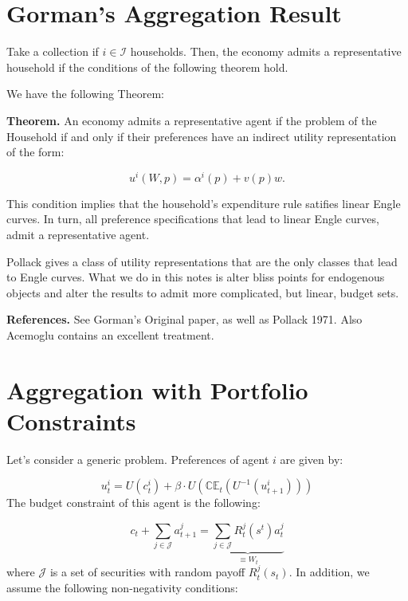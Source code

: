 \documentclass{article}
\begin{document}
\section{Gorman's Aggregation Result}

Take a collection if $i\in \mathcal{I}$ households. Then, the economy admits
a representative household if the conditions of the following theorem hold.

We have the following Theorem:

\textbf{Theorem.} An economy admits a representative agent if the problem of
the Household if and only if their preferences have an indirect utility
representation of the form:

\begin{equation*}
u^{i}\left( W,p\right) =\alpha ^{i}\left( p\right) +v\left( p\right) w.
\end{equation*}

This condition implies that the household's expenditure rule satifies linear
Engle curves. In turn, all preference specifications that lead to linear
Engle curves, admit a representative agent.

Pollack gives a class of utility representations that are the only classes
that lead to Engle curves. What we do in this notes is alter bliss points
for endogenous objects and alter the results to admit more complicated, but
linear, budget sets.

\textbf{References.} See Gorman's Original paper, as well as Pollack 1971.
Also Acemoglu contains an excellent treatment.

\section{Aggregation with Portfolio Constraints}

Let's consider a generic problem. Preferences of agent $i$ are given by:

\begin{equation*}
u_{t}^{i}=U\left( c_{t}^{i}\right) +\beta \cdot U\left( \mathbb{CE}%
_{t}\left( U^{-1}\left( u_{t+1}^{i}\right) \right) \right)
\end{equation*}%
The budget constraint of this agent is the following:

\begin{equation}
c_{t}+\sum_{j\in \mathcal{J}}a_{t+1}^{j}=\underbrace{\sum_{j\in \mathcal{J}%
}R_{t}^{j}\left( s^{t}\right) a_{t}^{j}}_{\equiv W_{t}}  \label{E_BC}
\end{equation}%
where $\mathcal{J}$ is a set of securities with random payoff $%
R_{t}^{j}\left( s_{t}\right) $. In addition, we assume the following
non-negativity conditions:
\end{document}
